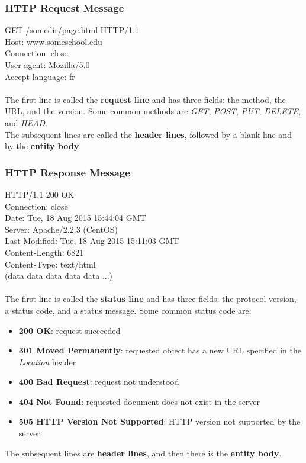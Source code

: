 \documentclass{article}
\begin{document}
\subsubsection*{HTTP Request Message}
\color{gray}
GET /somedir/page.html HTTP/1.1 \\ Host: www.someschool.edu \\ Connection: close \\ User-agent: Mozilla/5.0 \\ Accept-language: fr \\\\
\color{black}
The first line is called the \textbf{request line} and has three fields: the method, the URL, and the version. Some common methods are \textit{GET}, \textit{POST}, \textit{PUT}, \textit{DELETE}, and \textit{HEAD}. \\
The subsequent lines are called the \textbf{header lines}, followed by a blank line and by the \textbf{entity body}. 
\subsubsection*{HTTP Response Message}
\color{gray}
HTTP/1.1 200 OK \\ Connection: close \\ Date: Tue, 18 Aug 2015 15:44:04 GMT \\ Server: Apache/2.2.3 (CentOS) \\ Last-Modified: Tue, 18 Aug 2015 15:11:03 GMT \\ Content-Length: 6821 \\ Content-Type: text/html \\ (data data data data data ...) \\\\
\color{black}
The first line is called the \textbf{status line} and has three fields: the protocol version, a status code, and a status message. Some common status code are:
\begin{itemize}
    \item \textbf{200 OK}: request succeeded
    \item \textbf{301 Moved Permanently}: requested object has a new URL specified in the \textit{Location} header
    \item \textbf{400 Bad Request}: request not understood
    \item \textbf{404 Not Found}: requested document does not exist in the server
    \item \textbf{505 HTTP Version Not Supported}: HTTP version not supported by the server
\end{itemize}
The subsequent lines are \textbf{header lines}, and then there is the \textbf{entity body}.
\newpage
\end{document}
